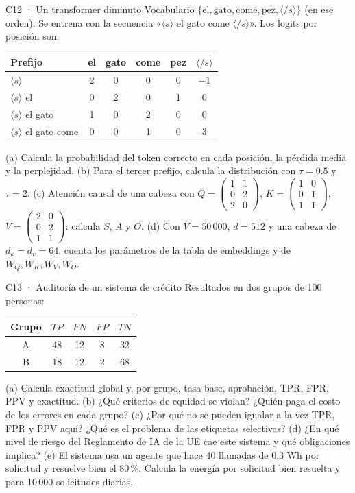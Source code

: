 \begin{ejercicio}{C12 · Un transformer diminuto }
Vocabulario $\{\text{el},\text{gato},\text{come},\text{pez},\langle/s\rangle\}$ (en ese orden). Se entrena con la secuencia
«$\langle s\rangle$ el gato come $\langle/s\rangle$». Los logits por posición son:
\begin{center}\small
\begin{tabular}{l|ccccc}
Prefijo & el & gato & come & pez & $\langle/s\rangle$\\\hline
$\langle s\rangle$ & 2 & 0 & 0 & 0 & $-1$\\
$\langle s\rangle$ el & 0 & 2 & 0 & 1 & 0\\
$\langle s\rangle$ el gato & 1 & 0 & 2 & 0 & 0\\
$\langle s\rangle$ el gato come & 0 & 0 & 1 & 0 & 3
\end{tabular}
\end{center}
(a)  Calcula la probabilidad del token correcto en cada posición, la pérdida media y la perplejidad.
(b)  Para el tercer prefijo, calcula la distribución con $\tau=0.5$ y $\tau=2$.
(c)  Atención causal de una cabeza con $Q=\begin{pmatrix}1&1\\0&2\\2&0\end{pmatrix}$, $K=\begin{pmatrix}1&0\\0&1\\1&1\end{pmatrix}$,
$V=\begin{pmatrix}2&0\\0&2\\1&1\end{pmatrix}$: calcula $S$, $A$ y $O$.
(d)  Con $V=50\,000$, $d=512$ y una cabeza de $d_k=d_v=64$, cuenta los parámetros de la tabla de embeddings y de $W_Q,W_K,W_V,W_O$.
\end{ejercicio}

\begin{ejercicio}{C13 · Auditoría de un sistema de crédito }
Resultados en dos grupos de 100 personas:
\begin{center}\small
\begin{tabular}{c|cccc}
Grupo & $TP$ & $FN$ & $FP$ & $TN$\\\hline
A & 48 & 12 & 8 & 32\\
B & 18 & 12 & 2 & 68
\end{tabular}
\end{center}
(a)  Calcula exactitud global y, por grupo, tasa base, aprobación, TPR, FPR, PPV y exactitud.
(b)  ¿Qué criterios de equidad se violan? ¿Quién paga el costo de los errores en cada grupo?
(c)  ¿Por qué no se pueden igualar a la vez TPR, FPR y PPV aquí? ¿Qué es el problema de las etiquetas selectivas?
(d)  ¿En qué nivel de riesgo del Reglamento de IA de la UE cae este sistema y qué obligaciones implica?
(e)  El sistema usa un agente que hace 40 llamadas de 0.3 Wh por solicitud y resuelve bien el 80\,\%. Calcula la energía
por solicitud bien resuelta y para 10\,000 solicitudes diarias.
\end{ejercicio}

